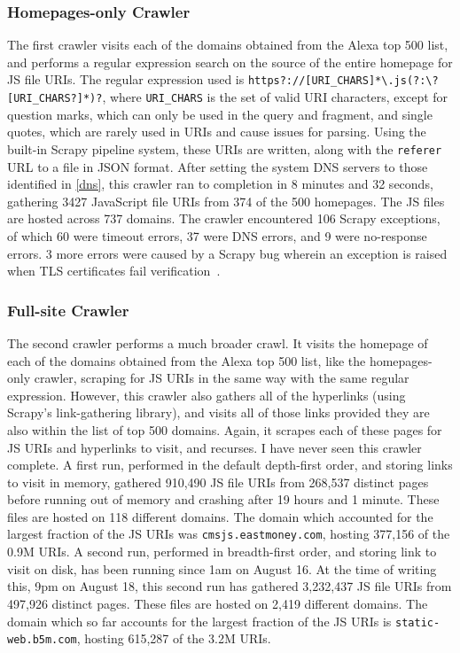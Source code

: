 \subsubsection*{Homepages-only Crawler}
The first crawler visits each of the domains obtained from the Alexa top 500 list, and performs a regular expression search on the source of the entire homepage for JS file URIs.
The regular expression used is \texttt{https?://[URI\_CHARS]*\textbackslash{}.js\allowbreak{}(?:\textbackslash{}?[URI\_CHARS?]*)?}, where \texttt{URI\_CHARS} is the set of valid URI characters, except for question marks, which can only be used in the query and fragment, and single quotes, which are rarely used in URIs and cause issues for parsing.
Using the built-in Scrapy pipeline system, these URIs are written, along with the \texttt{referer} URL to a file in JSON format.
After setting the system DNS servers to those identified in \autoref{dns}, this crawler ran to completion in 8 minutes and 32 seconds, gathering 3427 JavaScript file URIs from 374 of the 500 homepages.
The JS files are hosted across 737 domains.
The crawler encountered 106 Scrapy exceptions, of which 60 were timeout errors, 37 were DNS errors, and 9 were no-response errors.
3 more errors were caused by a Scrapy bug wherein an exception is raised when TLS certificates fail verification~\cite{Calderone2015}.
\subsubsection*{Full-site Crawler}
The second crawler performs a much broader crawl.
It visits the homepage of each of the domains obtained from the Alexa top 500 list, like the homepages-only crawler, scraping for JS URIs in the same way with the same regular expression.
However, this crawler also gathers all of the hyperlinks (using Scrapy's link-gathering library), and visits all of those links provided they are also within the list of top 500 domains.
Again, it scrapes each of these pages for JS URIs and hyperlinks to visit, and recurses.
I have never seen this crawler complete.
A first run, performed in the default depth-first order, and storing links to visit in memory, gathered 910,490 JS file URIs from 268,537 distinct pages before running out of memory and crashing after 19 hours and 1 minute.
These files are hosted on 118 different domains.
The domain which accounted for the largest fraction of the JS URIs was \texttt{cmsjs.eastmoney.com}, hosting 377,156 of the 0.9M URIs.
A second run, performed in breadth-first order, and storing link to visit on disk, has been running since 1am on August 16.
At the time of writing this, 9pm on August 18, this second run has gathered 3,232,437 JS file URIs from 497,926 distinct pages.
These files are hosted on 2,419 different domains.
The domain which so far accounts for the largest fraction of the JS URIs is \texttt{static-web.b5m.com}, hosting 615,287 of the 3.2M URIs.